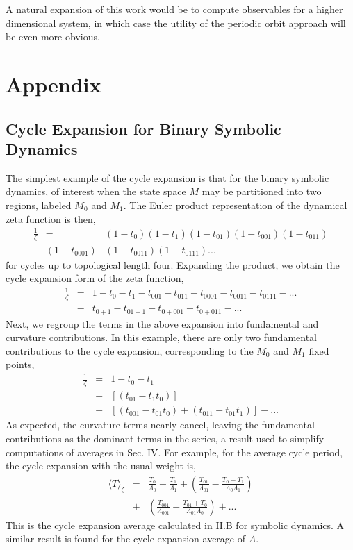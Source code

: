 \documentclass[pre,aps,twocolumn,showpacs,hyperref]{revtex4-1} %
\begin{document}
\indent A natural expansion of this work would be to compute observables for a higher dimensional system, in which case the utility of the periodic orbit approach will be even more obvious.
\newpage
\section{Appendix}
\subsection{Cycle Expansion for Binary Symbolic Dynamics}
The simplest example of the cycle expansion is that for the binary symbolic dynamics, of interest when the state space $M$ may be partitioned into two regions, labeled $M_{0}$ and $M_{1}$. The Euler product representation of the dynamical zeta function is then,
\begin{eqnarray*}
\frac{1}{\zeta} &=& (1 - t_{0})(1-t_{1})(1-t_{01})(1-t_{001})(1-t_{011})
\\ &(1-t_{0001})&(1-t_{0011})(1-t_{0111})...
\end{eqnarray*}
for cycles up to topological length four. Expanding the product, we obtain the cycle expansion form of the zeta function,
\begin{eqnarray*}
\frac{1}{\zeta} &=& 1 - t_{0} - t_{1} - t_{001} - t_{011} - t_{0001} - t_{0011} - t_{0111} - ...
\\ &-& t_{0+1} - t_{01+1} - t_{0+001} - t_{0+011} - ...
\end{eqnarray*}
Next, we regroup the terms in the above expansion into fundamental and curvature contributions. In this example, there are only two fundamental contributions to the cycle expansion, corresponding to the $M_{0}$ and $M_{1}$ fixed points,
\begin{eqnarray*}
\frac{1}{\zeta} &=& 1 - t_{0} - t_{1} \\ &-& [(t_{01} - t_{1}t_{0})] \\ &-& [(t_{001} - t_{01}t_{0}) + (t_{011} - t_{01}t_{1})] - ...
\end{eqnarray*}
As expected, the curvature terms nearly cancel, leaving the fundamental contributions as the dominant terms in the series, a result used to simplify computations of averages in Sec. IV. For example, for the average cycle period, the cycle expansion with the usual weight is,
\begin{eqnarray*}
\langle T \rangle_{\zeta} &=& \frac{T_{0}}{\Lambda_{0}} + \frac{T_{1}}{\Lambda_{1}} + \left( \frac{T_{01}}{\Lambda_{01}}-\frac{T_{0} + T_{1}}{\Lambda_{0}\Lambda_{1}}\right)
\\ &+& \left( \frac{T_{001}}{\Lambda_{001}}-\frac{T_{01} + T_{0}}{\Lambda_{01}\Lambda_{0}}\right) +...
\end{eqnarray*}
This is the cycle expansion average calculated in II.B for symbolic dynamics. A similar result is found for the cycle expansion average of $A$.
\end{document}
